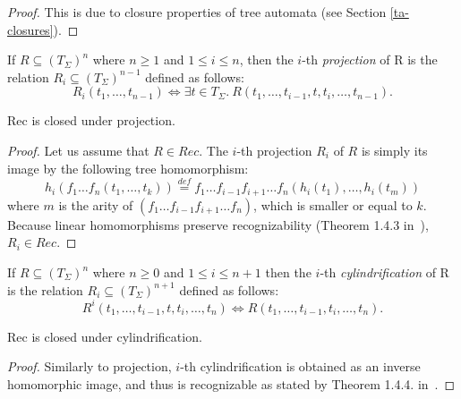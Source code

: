 \begin{proof}
This is due to closure properties of tree automata (see Section
\ref{ta-closures}).
\end{proof}

\begin{defz}
If $R \subseteq (T_\Sigma)^n$ where $n \geq 1$ and $1 \leq i \leq n$, then the
$i$-th \emph{projection} of R is the relation $R_i \subseteq (T_\Sigma)^{n-1}$
defined as follows: 
\begin{equation}
 R_i(t_1,\ldots,t_{n-1}) \Leftrightarrow \exists t \in T_\Sigma
.\ R(t_1,\ldots,t_{i-1},t,t_i,\ldots,t_{n-1}).
\end{equation}
\end{defz}

\begin{lemma}
Rec is closed under projection.
\end{lemma}

\begin{proof}
 Let us assume that $R \in Rec$. The $i$-th projection $R_i$ of $R$ is simply
 its image by the following tree homomorphism:
 \begin{equation}
 h_i(f_1\ldots f_n (t_1,\ldots,t_k)) \overset{\mathit{def}}{=} f_1\ldots f_{i-1}f_{i+1}\ldots f_n(h_i(t_1),\ldots,h_i(t_m))
\end{equation}
where $m$ is the arity of $(f_1\ldots f_{i-1}f_{i+1}\ldots f_n)$, which is
smaller or equal to $k$. Because linear homomorphisms preserve recognizability
(Theorem 1.4.3 in~\cite{tata}), $R_i \in Rec$.
\end{proof}

\begin{defz}
 If $R \subseteq (T_\Sigma)^n$ where $n \geq 0$ and $1 \leq i \leq n+1$ then the
 $i$-th \emph{cylindrification} of R is the relation $R_i \subseteq
 (T_\Sigma)^{n+1}$ defined as follows: 
\begin{equation}
 R^i(t_1,\ldots,t_{i-1},t,t_i,\ldots,t_n)
 \Leftrightarrow R(t_1,\ldots,t_{i-1},t_i,\ldots,t_n).
\end{equation}
\end{defz}

\begin{lemma}
Rec is closed under cylindrification.
\end{lemma}

\begin{proof}
 Similarly to projection, $i$-th cylindrification is obtained as an inverse
 homomorphic image, and thus is recognizable as stated by Theorem 1.4.4. in~\cite{tata}.
\end{proof}

